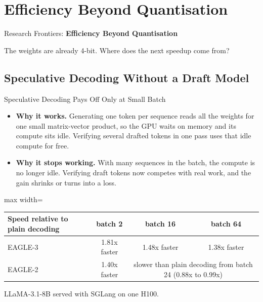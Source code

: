 \section{Efficiency Beyond Quantisation}

\begin{frame}{}
    \LARGE Research Frontiers: \textbf{Efficiency Beyond Quantisation}

    \vspace{1em}
    \normalsize The weights are already 4-bit. Where does the next speedup come from?
\end{frame}

\subsection{Speculative Decoding Without a Draft Model}

\begin{frame}{Speculative Decoding Pays Off Only at Small Batch}
    \begin{itemize}\itemsep0.2em
        \item \textbf{Why it works.} Generating one token per sequence reads all the weights for one small matrix-vector product, so the GPU waits on memory and its compute sits idle. Verifying several drafted tokens in one pass uses that idle compute for free.
        \item \textbf{Why it stops working.} With many sequences in the batch, the compute is no longer idle. Verifying draft tokens now competes with real work, and the gain shrinks or turns into a loss.
    \end{itemize}
    \vspace{0.2em}
    \begin{center}
    \small
    \begin{adjustbox}{max width=\linewidth}\begin{tabular}{lccc}
        \toprule
        \textbf{Speed relative to plain decoding} & \textbf{batch 2} & \textbf{batch 16} & \textbf{batch 64} \\
        \midrule
        EAGLE-3 & 1.81x faster & 1.48x faster & 1.38x faster \\
        EAGLE-2 & 1.40x faster & \multicolumn{2}{c}{slower than plain decoding from batch 24 (0.88x to 0.99x)} \\
        \bottomrule
    \end{tabular}\end{adjustbox}

    {\scriptsize LLaMA-3.1-8B served with SGLang on one H100.}
    \end{center}
\end{frame}

